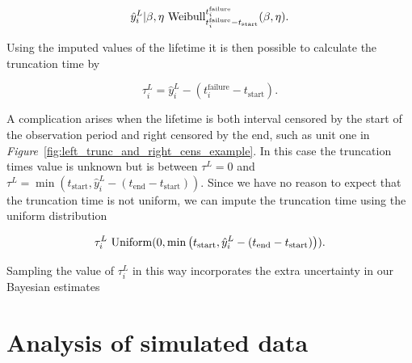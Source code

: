 \begin{equation}
    \hat{y}^L_i|\beta, \eta ~ \hbox{Weibull}^{t^{\text{failure}}_{i}}_{t^{\text{failure}}_{i} - t_\text{start}}(\beta, \eta).
\end{equation}

\noindent Using the imputed values of the lifetime it is then possible to calculate the truncation time by

\begin{equation}
    \tau^L_i = \hat{y}^L_i - \left(t^{\text{failure}}_{i} - t_\text{start}\right).
\end{equation}

A complication arises when the lifetime is both interval censored by the start of the observation period and right censored by the end, such as unit one in \textit{Figure}~\ref{fig:left_trunc_and_right_cens_example}. In this case the truncation times value is unknown but is between $\tau^L = 0$ and $\tau^L = \min\left(t_\text{start}, \hat{y}^L_i - (t_\text{end} - t_\text{start})\right)$. Since we have no reason to expect that the truncation time is not uniform, we can impute the truncation time using the uniform distribution

\begin{equation}
    \tau^L_i ~ \hbox{Uniform}(0, \min\left(t_\text{start}, \hat{y}^L_i - (t_\text{end} - t_\text{start})\right)).
\end{equation}

\noindent Sampling the value of $\tau^L_i$ in this way incorporates the extra uncertainty in our Bayesian estimates

\section{Analysis of simulated data}

